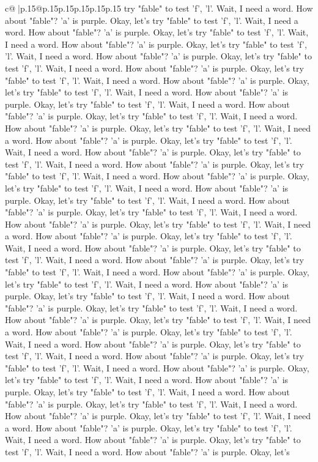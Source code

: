 \documentclass{article}
\begin{document}
{\begin{supertabular}{c@{$\;$}|p{.15\linewidth}@{}p{.15\linewidth}p{.15\linewidth}p{.15\linewidth}p{.15\linewidth}p{.15\linewidth}}
{{{try "fable" to test 'f', 'l'. Wait, I need a word. How about "fable"? 'a' is purple. Okay, let's try "fable" to test 'f', 'l'. Wait, I need a word. How about "fable"? 'a' is purple. Okay, let's try "fable" to test 'f', 'l'. Wait, I need a word. How about "fable"? 'a' is purple. Okay, let's try "fable" to test 'f', 'l'. Wait, I need a word. How about "fable"? 'a' is purple. Okay, let's try "fable" to test 'f', 'l'. Wait, I need a word. How about "fable"? 'a' is purple. Okay, let's try "fable" to test 'f', 'l'. Wait, I need a word. How about "fable"? 'a' is purple. Okay, let's try "fable" to test 'f', 'l'. Wait, I need a word. How about "fable"? 'a' is purple. Okay, let's try "fable" to test 'f', 'l'. Wait, I need a word. How about "fable"? 'a' is purple. Okay, let's try "fable" to test 'f', 'l'. Wait, I need a word. How about "fable"? 'a' is purple. Okay, let's try "fable" to test 'f', 'l'. Wait, I need a word. How about "fable"? 'a' is purple. Okay, let's try "fable" to test 'f', 'l'. Wait, I need a word. How about "fable"? 'a' is purple. Okay, let's try "fable" to test 'f', 'l'. Wait, I need a word. How about "fable"? 'a' is purple. Okay, let's try "fable" to test 'f', 'l'. Wait, I need a word. How about "fable"? 'a' is purple. Okay, let's try "fable" to test 'f', 'l'. Wait, I need a word. How about "fable"? 'a' is purple. Okay, let's try "fable" to test 'f', 'l'. Wait, I need a word. How about "fable"? 'a' is purple. Okay, let's try "fable" to test 'f', 'l'. Wait, I need a word. How about "fable"? 'a' is purple. Okay, let's try "fable" to test 'f', 'l'. Wait, I need a word. How about "fable"? 'a' is purple. Okay, let's try "fable" to test 'f', 'l'. Wait, I need a word. How about "fable"? 'a' is purple. Okay, let's try "fable" to test 'f', 'l'. Wait, I need a word. How about "fable"? 'a' is purple. Okay, let's try "fable" to test 'f', 'l'. Wait, I need a word. How about "fable"? 'a' is purple. Okay, let's try "fable" to test 'f', 'l'. Wait, I need a word. How about "fable"? 'a' is purple. Okay, let's try "fable" to test 'f', 'l'. Wait, I need a word. How about "fable"? 'a' is purple. Okay, let's try "fable" to test 'f', 'l'. Wait, I need a word. How about "fable"? 'a' is purple. Okay, let's try "fable" to test 'f', 'l'. Wait, I need a word. How about "fable"? 'a' is purple. Okay, let's try "fable" to test 'f', 'l'. Wait, I need a word. How about "fable"? 'a' is purple. Okay, let's try "fable" to test 'f', 'l'. Wait, I need a word. How about "fable"? 'a' is purple. Okay, let's try "fable" to test 'f', 'l'. Wait, I need a word. How about "fable"? 'a' is purple. Okay, let's try "fable" to test 'f', 'l'. Wait, I need a word. How about "fable"? 'a' is purple. Okay, let's try "fable" to test 'f', 'l'. Wait, I need a word. How about "fable"? 'a' is purple. Okay, let's try "fable" to test 'f', 'l'. Wait, I need a word. How about "fable"? 'a' is purple. Okay, let's try "fable" to test 'f', 'l'. Wait, I need a word. How about "fable"? 'a' is purple. Okay, let's try "fable" to test 'f', 'l'. Wait, I need a word. How about "fable"? 'a' is purple. Okay, let's try "fable" to test 'f', 'l'. Wait, I need a word. How about "fable"? 'a' is purple. Okay, let's }}}
\end{supertabular}}
\end{document}
